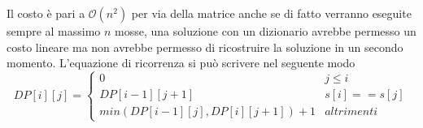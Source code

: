 \documentclass[../cheatSheetAlgoritmi.tex]{subfiles}
\begin{document}
Il costo è pari a $\mathcal{O}(n^{2})$ per via della matrice anche se di fatto verranno eseguite sempre al massimo $n$ mosse, una soluzione con un dizionario avrebbe permesso un costo lineare ma non avrebbe permesso di ricostruire la soluzione in un secondo momento. L'equazione di ricorrenza si può scrivere nel seguente modo 
\begin{equation*}
  	DP[i][j] =\begin{cases}
    	0 & \text{$j \leq i$}\\
    	DP[i-1][j+1] & \text{$s[i] == s[j]$}\\
    	min(DP[i-1][j], DP[i][j+1])+1 & \text{$altrimenti$}
  	\end{cases}
\end{equation*}
\newpage
\end{document}
